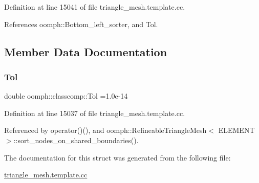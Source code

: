 Definition at line 15041 of file triangle\+\_\+mesh.\+template.\+cc.



References oomph\+::\+Bottom\+\_\+left\+\_\+sorter, and Tol.



\subsection{Member Data Documentation}
\mbox{\label{structoomph_1_1classcomp_a383e0604797b23fc66a566f1b278b47b}} 
\subsubsection{\texorpdfstring{Tol}{Tol}}
{\footnotesize\ttfamily double oomph\+::classcomp\+::\+Tol =1.\+0e-\/14\hspace{0.3cm}{\ttfamily [static]}}



Definition at line 15037 of file triangle\+\_\+mesh.\+template.\+cc.



Referenced by operator()(), and oomph\+::\+Refineable\+Triangle\+Mesh$<$ E\+L\+E\+M\+E\+N\+T $>$\+::sort\+\_\+nodes\+\_\+on\+\_\+shared\+\_\+boundaries().



The documentation for this struct was generated from the following file\+:\begin{DoxyCompactItemize}
\item 
\hyperlink{triangle__mesh_8template_8cc}{triangle\+\_\+mesh.\+template.\+cc}\end{DoxyCompactItemize}
